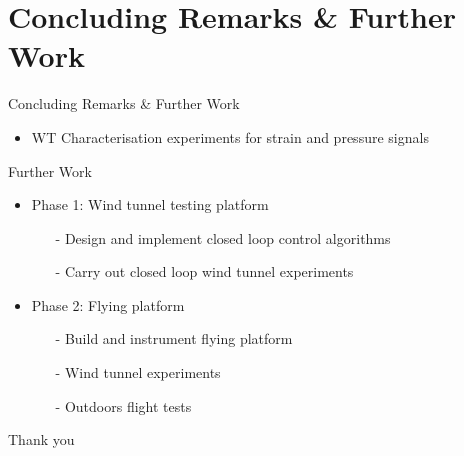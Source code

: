 \documentclass[aspectratio=169]{beamer}            %
\begin{document}

\section{Concluding Remarks \& Further Work}
\begin{frame}{Concluding Remarks \& Further Work}


  \pause
  \begin{itemize}[<+->]
    \item WT Characterisation experiments for strain and pressure signals
  \end{itemize}
	\pause
	Further Work
	\pause
  \begin{itemize}[<+->]
    \item Phase 1: Wind tunnel testing platform
      \begin{itemize}[<+->]
      \item[-]Design and implement closed loop control algorithms
      \item[-]Carry out closed loop wind tunnel experiments
      \end{itemize}
	
    \item Phase 2: Flying platform
      \begin{itemize}[<+->]
			\item[-]Build and instrument flying platform
      \item[-]Wind tunnel experiments
      \item[-]Outdoors flight tests
      \end{itemize}
  \end{itemize}
	
\end{frame}

\begin{frame}{}

  \centering
	\Huge{Thank you}

\end{frame}

\end{document}
